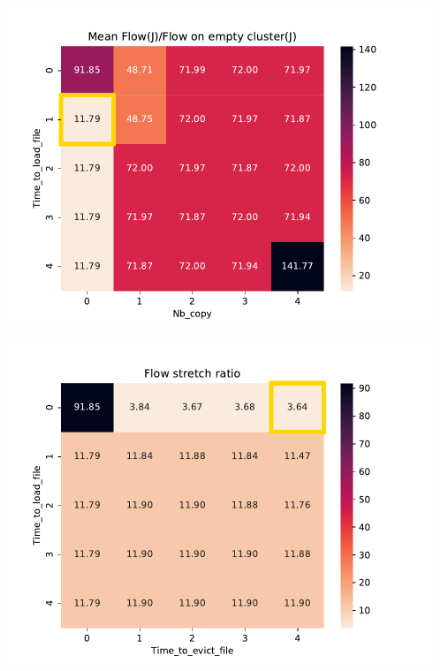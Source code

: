 \documentclass[a4paper]{article}
\begin{document}
\begin{figure}[H]\centering\includegraphics[width=1\linewidth]{MBSS/plot/FCFS_Score_Expe_V2/Heatmap_FCFS_Score_Time_to_load_file_Nb_copy_2022-02-08->2022-02-08_very_reduced_95_128_4_256_1_1024.pdf}\caption{}\end{figure}
\begin{figure}[H]\centering\includegraphics[width=1\linewidth]{MBSS/plot/FCFS_Score_Expe_V2/Heatmap_FCFS_Score_Time_to_load_file_Time_to_evict_file_2022-02-08->2022-02-08_very_reduced_95_128_4_256_1_1024.pdf}\caption{}\end{figure}
\end{document}
